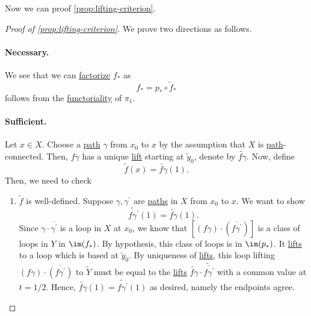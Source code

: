 \par Now we can proof \autoref{prop:lifting-criterion}.
\begin{proof}[Proof of \autoref{prop:lifting-criterion}]\let\qed\relax
	We prove two directions as follows.
	\paragraph{Necessary.} We see that we can \hyperref[def:factorization]{factorize} \(f_\ast\) as
	\[
		f_\ast = p_\ast \circ \widetilde{f} _\ast
	\]
	follows from the \hyperref[def:functor]{functoriality} of \(\pi _1\).
	\paragraph{Sufficient.} Let \(x\in X\). Choose a \hyperref[def:path]{path} \(\gamma\) from \(x_0\) to \(x\) by the assumption that \(X\) is \hyperref[def:path]{path}-connected.
	Then, \(f \gamma \) has a unique \hyperref[def:lift]{lift} starting at \(\widetilde{y} _0\), denote by \(\widetilde{f\gamma}\).
	Now, define
	\[
		\widetilde{f} (x) = \widetilde{f \gamma } (1).
	\]
	Then, we need to check
	\begin{enumerate}[(1)]
		\item \(\widetilde{f} \) is well-defined. Suppose \(\gamma , \gamma ^\prime \) are \hyperref[def:path]{paths} in \(X\) from \(x_0\)
		      to \(x\). We want to show
		      \[
			      \widetilde{f \gamma^\prime} (1) = \widetilde{f \gamma } (1).
		      \]
		      Since \(\gamma \cdot \overline{\gamma^\prime}\) is a loop in \(X\) at \(x_{0}\), we know that \([(f \gamma)\cdot (\overline{f \gamma ^\prime}) ]\) is a class of
		      loops in \(Y\) in \(\im  (f_\ast)\). By hypothesis, this class of loops is in \(\im  (p_*)\).
		      It \hyperref[prop:homotopy-lifting-property]{lifts} to a loop which is based at \(\widetilde{y} _0\). By uniqueness of
		      \hyperref[prop:homotopy-lifting-property]{lifts}, this loop lifting \((f \gamma )\cdot \overline{(f \gamma ^\prime )}\) to \(\widetilde{Y} \)
		      must be equal to the \hyperref[prop:homotopy-lifting-property]{lifts} \(\widetilde{f \gamma }\cdot \widetilde{\overline{f \gamma ^\prime }}  \)
		      with a common value at \(t = 1 / 2\). Hence, \(\widetilde{f \gamma }(1) = \widetilde{f \gamma ^\prime }(1)\) as desired, namely the endpoints agree.
		      \begin{figure}[H]
			      \centering
			      \label{fig:pf:prop:lifting-criterion}
		      \end{figure}
	\end{enumerate}
\end{proof}